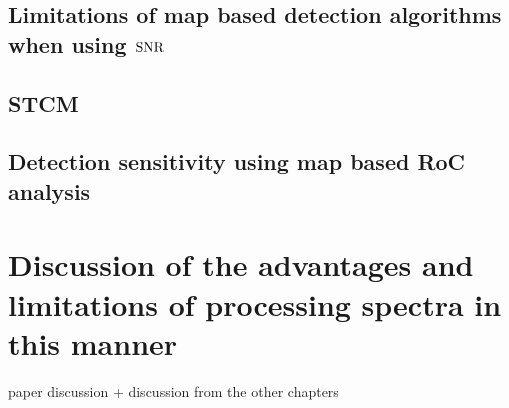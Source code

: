 \section{Limitations of map based detection algorithms when using $\rm{SNR}$}
\section{STCM}
\section{Detection sensitivity using map based RoC analysis}
\chapter{Discussion of the advantages and limitations of processing spectra in this manner}
paper discussion + discussion from the other chapters
